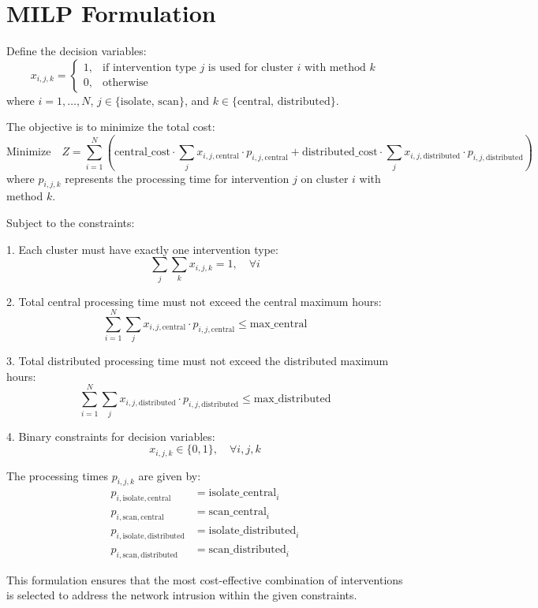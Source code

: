 \documentclass{article}
\begin{document}
\section*{MILP Formulation}

Define the decision variables:
\[
x_{i, j, k} = 
\begin{cases} 
1, & \text{if intervention type $j$ is used for cluster $i$ with method $k$} \\
0, & \text{otherwise}
\end{cases}
\]
where \( i = 1, \ldots, N \), \( j \in \{\text{isolate, scan}\} \), and \( k \in \{\text{central, distributed}\} \).

The objective is to minimize the total cost:
\[
\text{Minimize} \quad Z = \sum_{i=1}^{N} \left( \text{central\_cost} \cdot \sum_{j} x_{i, j, \text{central}} \cdot p_{i, j, \text{central}} + \text{distributed\_cost} \cdot \sum_{j} x_{i, j, \text{distributed}} \cdot p_{i, j, \text{distributed}} \right)
\]
where \( p_{i, j, k} \) represents the processing time for intervention $j$ on cluster $i$ with method $k$.

Subject to the constraints:

1. Each cluster must have exactly one intervention type:
\[
\sum_{j} \sum_{k} x_{i, j, k} = 1, \quad \forall i
\]

2. Total central processing time must not exceed the central maximum hours:
\[
\sum_{i=1}^{N} \sum_{j} x_{i, j, \text{central}} \cdot p_{i, j, \text{central}} \leq \text{max\_central}
\]

3. Total distributed processing time must not exceed the distributed maximum hours:
\[
\sum_{i=1}^{N} \sum_{j} x_{i, j, \text{distributed}} \cdot p_{i, j, \text{distributed}} \leq \text{max\_distributed}
\]

4. Binary constraints for decision variables:
\[
x_{i, j, k} \in \{0, 1\}, \quad \forall i, j, k
\]

The processing times \( p_{i, j, k} \) are given by:
\begin{align*}
p_{i, \text{isolate}, \text{central}} &= \text{isolate\_central}_{i} \\
p_{i, \text{scan}, \text{central}} &= \text{scan\_central}_{i} \\
p_{i, \text{isolate}, \text{distributed}} &= \text{isolate\_distributed}_{i} \\
p_{i, \text{scan}, \text{distributed}} &= \text{scan\_distributed}_{i}
\end{align*}

This formulation ensures that the most cost-effective combination of interventions is selected to address the network intrusion within the given constraints.
\end{document}
